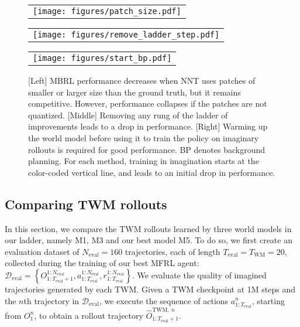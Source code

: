  
\begin{figure*}[t!]
    \centering
    \begin{tabular}{c}
        \texttt{[image: figures/patch\_size.pdf]}
    \end{tabular}
    \hspace{-5mm}
    \begin{tabular}{c}
        \texttt{[image: figures/remove\_ladder\_step.pdf]}
    \end{tabular}
    \hspace{-5mm}
    \begin{tabular}{c}
        \texttt{[image: figures/start\_bp.pdf]}
    \end{tabular}
    \vspace{-1em}
    \caption{[Left] MBRL performance decreases when NNT uses patches of smaller or larger size than the ground truth, but it remains competitive. However, performance collapses if the patches are not quantized. 
    [Middle] Removing any rung of the ladder of improvements leads to a drop in performance.
    [Right] Warming up the world model before using it to train the policy on imaginary rollouts is required for good performance. BP denotes background planning. For each method, training in imagination
    starts at the color-coded vertical line, and leads to an initial drop in performance.}
    \label{fig:ablation}
\vspace{-.5em}
\end{figure*}
 

\subsection{Comparing TWM rollouts}
\label{sec:stationary}

In this section, we compare the TWM rollouts learned by three world models in our ladder, namely M1, M3 and our best model M5. 
To do so, we first create an evaluation dataset of $N_{\text{eval}}=160$ trajectories, each of length $T_{\text{eval}}=T_{\text{WM}}=20$, collected during the training of our best MFRL agent:
$\mathcal{D}_{\text{eval}} = \left\{O^{1:N_{\text{eval}}}_{1:T_{\text{eval}}+1}, a^{1:N_{\text{eval}}}_{1:T_{\text{eval}}}, r^{1:N_{\text{eval}}}_{1:T_{\text{eval}}} \right\}$.
We evaluate the quality of imagined trajectories generated by each TWM. 
Given a TWM checkpoint at 1M steps and the $n$th trajectory in $\mathcal{D}_{\text{eval}}$, we execute the sequence of actions $a^n_{1:T_{\text{eval}}}$, starting from $O^n_{1}$, to obtain a rollout trajectory $\hat{O}^{\text{TWM},~n}_{1:T_{\text{eval}} + 1}$. 

